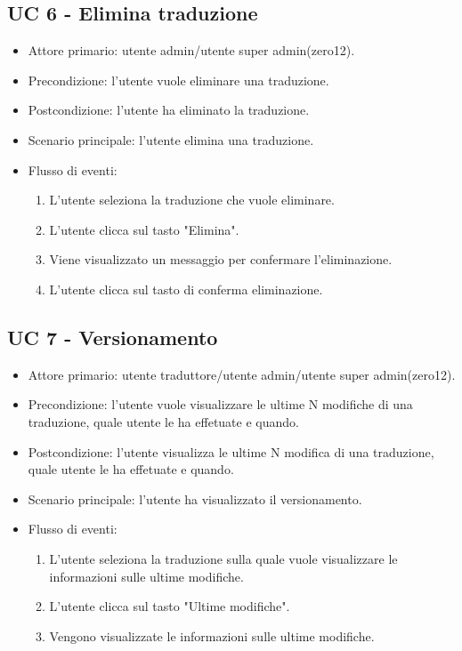 \subsection{UC 6 - Elimina traduzione}
    \begin{itemize}
        \item Attore primario: utente admin/utente super admin(zero12).
        \item Precondizione: l'utente vuole eliminare una traduzione.
        \item Postcondizione: l'utente ha eliminato la traduzione.
        \item Scenario principale: l'utente elimina una traduzione.
        \item Flusso di eventi:
            \begin{enumerate}
                \item L'utente seleziona la traduzione che vuole eliminare.
                \item L'utente clicca sul tasto "Elimina".
                \item Viene visualizzato un messaggio per confermare l'eliminazione.
                \item L'utente clicca sul tasto di conferma eliminazione.
            \end{enumerate}
    \end{itemize}
\subsection{UC 7 - Versionamento}
    \begin{itemize}
        \item Attore primario: utente traduttore/utente admin/utente super admin(zero12).
        \item Precondizione: l'utente vuole visualizzare le ultime N modifiche di una traduzione, quale utente le ha effetuate e quando.
        \item Postcondizione: l'utente visualizza le ultime N modifica di una traduzione, quale utente le ha effetuate e quando.
        \item Scenario principale: l'utente ha visualizzato il versionamento.
        \item Flusso di eventi:
        \begin{enumerate}
            \item L'utente seleziona la traduzione sulla quale vuole visualizzare le informazioni sulle ultime modifiche.
            \item L'utente clicca sul tasto "Ultime modifiche".
            \item Vengono visualizzate le informazioni sulle ultime modifiche.
        \end{enumerate}
    \end{itemize}   
